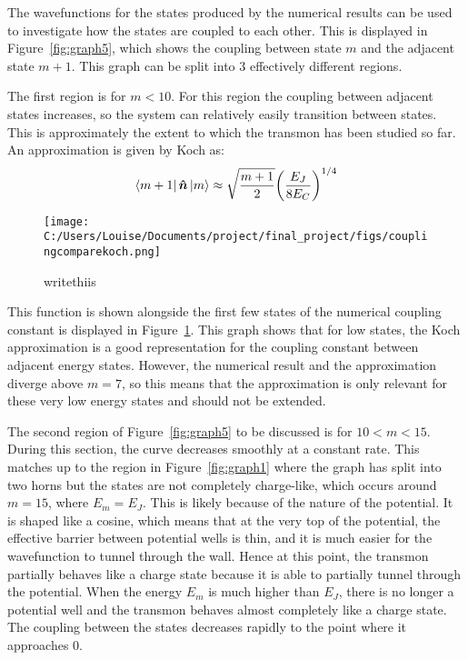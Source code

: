 \documentclass[11pt]{article}
\begin{document}
The wavefunctions for the states produced by the numerical results can be used to investigate how the states are coupled to each other. This is displayed in Figure~\ref{fig:graph5}, which shows the coupling between state $m$ and the adjacent state $m+1$. This graph can be split into 3 effectively different regions.

The first region is for $m<10$. For this region the coupling between adjacent states increases, so the system can relatively easily transition between states. This is approximately the extent to which the transmon has been studied so far. An approximation is given by Koch as:
\begin{equation} \label{eq:10}
\bra{m+1}\boldsymbol{\hat{n}}\ket{m} \approx \sqrt{\frac{m+1}{2}} \bigg( \frac{E_J}{8E_C}\bigg)^{1/4}
\end{equation}
\begin{figure}[ht]
\centering
\texttt{[image: C:/Users/Louise/Documents/project/final\_project/figs/couplingcomparekoch.png]}
\caption{writethiis}
\label{fig:graph7}
\end{figure}
This function is shown alongside the first few states of the numerical coupling constant is displayed in Figure~\ref{fig:graph7}. This graph shows that for low states, the Koch approximation is a good representation for the coupling constant between adjacent energy states. However, the numerical result and the approximation diverge above $m=7$, so this means that the approximation is only relevant for these very low energy states and should not be extended.

The second region of Figure~\ref{fig:graph5} to be discussed is for $10<m<15$. During this section, the curve decreases smoothly at a constant rate. This matches up to the region in Figure~\ref{fig:graph1} where the graph has split into two horns but the states are not completely charge-like, which occurs around $m=15$, where $E_m = E_J$. This is likely because of the nature of the potential. It is shaped like a cosine, which means that at the very top of the potential, the effective barrier between potential wells is thin, and it is much easier for the wavefunction to tunnel through the wall. Hence at this point, the transmon partially behaves like a charge state because it is able to partially tunnel through the potential. When the energy $E_m$ is much higher than $E_J$, there is no longer a potential well and the transmon behaves almost completely like a charge state. The coupling between the states decreases rapidly to the point where it approaches 0.
\end{document}
